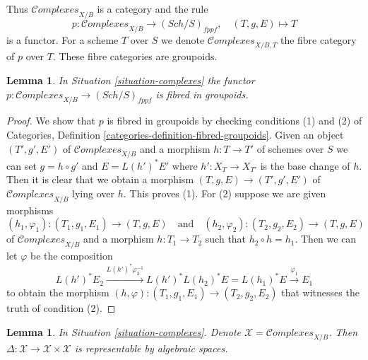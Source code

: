 \documentclass{stacks-project}
\theoremstyle{plain}
\newtheorem{lemma}[subsection]{Lemma}
\theoremstyle{definition}
\theoremstyle{remark}
\numberwithin{equation}{subsection}
\def\Sch{\mathit{Sch}}
\def\Complexesstack{\mathcal{C}\!\mathit{omplexes}}
\begin{document}
\noindent
Thus $\Complexesstack_{X/B}$ is a category and the rule
$$
p : \Complexesstack_{X/B} \longrightarrow (\Sch/S)_{fppf},
\quad
(T, g, E) \longmapsto T
$$
is a functor. For a scheme $T$ over $S$ we denote $\Complexesstack_{X/B, T}$
the fibre category of $p$ over $T$. These fibre categories are groupoids.

\begin{lemma}
\label{lemma-complexes-fibred-in-groupoids}
In Situation \ref{situation-complexes} the functor
$p : \Complexesstack_{X/B} \longrightarrow (\Sch/S)_{fppf}$
is fibred in groupoids.
\end{lemma}

\begin{proof}
We show that $p$ is fibred in groupoids by checking conditions
(1) and (2) of Categories, Definition
\ref{categories-definition-fibred-groupoids}.
Given an object $(T', g', E')$
of $\Complexesstack_{X/B}$ and a morphism $h : T \to T'$ of
schemes over $S$ we can set $g = h \circ g'$ and
$E = L(h')^*E'$ where $h' : X_T \to X_{T'}$
is the base change of $h$. Then it is clear that we obtain
a morphism $(T, g, E) \to (T', g', E')$
of $\Complexesstack_{X/B}$ lying over $h$. This proves (1).
For (2) suppose we are given morphisms
$$
(h_1, \varphi_1) : (T_1, g_1, E_1) \to (T, g, E)
\quad\text{and}\quad
(h_2, \varphi_2) : (T_2, g_2, E_2) \to (T, g, E)
$$
of $\Complexesstack_{X/B}$ and a morphism $h : T_1 \to T_2$ such that
$h_2 \circ h = h_1$. Then we can let $\varphi$ be the composition
$$
L(h')^*E_2
\xrightarrow{L(h')^*\varphi_2^{-1}}
L(h')^*L(h_2)^*E = L(h_1)^*E
\xrightarrow{\varphi_1}
E_1
$$
to obtain the morphism
$(h, \varphi) : (T_1, g_1, E_1) \to (T_2, g_2, E_2)$
that witnesses the truth of condition (2).
\end{proof}

\begin{lemma}
\label{lemma-complexes-diagonal}
In Situation \ref{situation-complexes}. Denote
$\mathcal{X} = \Complexesstack_{X/B}$. Then
$\Delta : \mathcal{X} \to \mathcal{X} \times \mathcal{X}$ is
representable by algebraic spaces.
\end{lemma}
\end{document}
